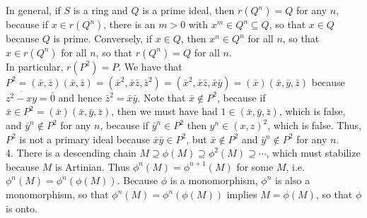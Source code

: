 \documentclass[11pt]{article}
\begin{document}
In general, if $S$ is a ring and $Q$ is a prime ideal, then $r(Q^n)=Q$ for any $n$, because if $x\in r(Q^n)$, there is an $m>0$ with $x^m\in Q^n\subseteq Q$, so that $x\in Q$ because $Q$ is prime. Conversely, if $x\in Q$, then $x^n\in Q^n$ for all $n$, so that $x\in r(Q^n)$ for all $n$, so that $r(Q^n)=Q$ for all $n$.\\

In particular, $r(P^2)=P$. We have that $P^2=(\bar{x},\bar{z})(\bar{x},\bar{z})=(\bar{x}^2,\bar{x}\bar{z},\bar{z}^2)=(\bar{x}^2,\bar{x}\bar{z},\bar{x}\bar{y})=(\bar{x})(\bar{x},\bar{y},\bar{z})$ because $\overline{z^2-xy}=\bar{0}$ and hence $\bar{z}^2=\bar{x}\bar{y}$. Note that $\bar{x}\notin P^2$, because if $\bar{x}\in P^2=(\bar{x})(\bar{x},\bar{y},\bar{z})$, then we must have had $1\in(\bar{x},\bar{y},\bar{z})$, which is false, and $\bar{y}^n\notin P^2$ for any $n$, because if $\bar{y}^n\in P^2$ then $y^n\in (x,z)^2$, which is false. Thus, $P^2$ is not a primary ideal because $\bar{x}\bar{y}\in P^2$, but $\bar{x}\notin P^2$ and $\bar{y}^n\notin P^2$ for any $n$.\\

\num{4.} There is a descending chain $M\supseteq \phi(M)\supseteq\phi^2(M)\supseteq\cdots$, which must stabilize because $M$ is Artinian. Thus $\phi^n(M)=\phi^{n+1}(M)$ for some $M$, i.e. $\phi^n(M)=\phi^n(\phi(M))$. Because $\phi$ is a monomorphism, $\phi^n$ is also a monomorphism, so that $\phi^n(M)=\phi^n(\phi(M))$ implies $M=\phi(M)$, so that $\phi$ is onto.     \\
\end{document}
